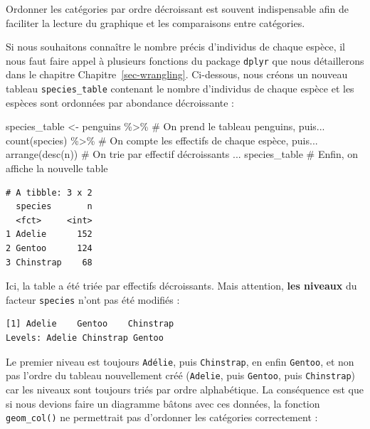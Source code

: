 \documentclass[
  letterpaper,
  DIV=11,
  numbers=noendperiod]{scrreprt}
\newenvironment{Shaded}{\begin{snugshade}}{\end{snugshade}}
\newcommand{\CommentTok}[1]{\textcolor[rgb]{0.37,0.37,0.37}{#1}}
\newcommand{\FunctionTok}[1]{\textcolor[rgb]{0.28,0.35,0.67}{#1}}
\newcommand{\NormalTok}[1]{\textcolor[rgb]{0.00,0.23,0.31}{#1}}
\newcommand{\OtherTok}[1]{\textcolor[rgb]{0.00,0.23,0.31}{#1}}
\newcommand{\SpecialCharTok}[1]{\textcolor[rgb]{0.37,0.37,0.37}{#1}}
\begin{document}
Ordonner les catégories par ordre décroissant est souvent indispensable
afin de faciliter la lecture du graphique et les comparaisons entre
catégories.

Si nous souhaitons connaître le nombre précis d'individus de chaque
espèce, il nous faut faire appel à plusieurs fonctions du package
\texttt{dplyr} que nous détaillerons dans le chapitre
Chapitre~\ref{sec-wrangling}. Ci-dessous, nous créons un nouveau tableau
\texttt{species\_table} contenant le nombre d'individus de chaque espèce
et les espèces sont ordonnées par abondance décroissante :

\begin{Shaded}
\begin{Highlighting}[]
\NormalTok{species\_table }\OtherTok{\textless{}{-}}\NormalTok{ penguins }\SpecialCharTok{\%\textgreater{}\%}   \CommentTok{\# On prend le tableau penguins, puis...}
  \FunctionTok{count}\NormalTok{(species) }\SpecialCharTok{\%\textgreater{}\%}            \CommentTok{\# On compte les effectifs de chaque espèce, puis...}
  \FunctionTok{arrange}\NormalTok{(}\FunctionTok{desc}\NormalTok{(n))              }\CommentTok{\# On trie par effectif décroissants ...}
\NormalTok{species\_table                   }\CommentTok{\# Enfin, on affiche la nouvelle table}
\end{Highlighting}
\end{Shaded}

\begin{verbatim}
# A tibble: 3 x 2
  species       n
  <fct>     <int>
1 Adelie      152
2 Gentoo      124
3 Chinstrap    68
\end{verbatim}

Ici, la table a été triée par effectifs décroissants. Mais attention,
\textbf{les niveaux} du facteur \texttt{species} n'ont pas été modifiés
:

\begin{Shaded}
\end{Shaded}

\begin{verbatim}
[1] Adelie    Gentoo    Chinstrap
Levels: Adelie Chinstrap Gentoo
\end{verbatim}

Le premier niveau est toujours \texttt{Adélie}, puis \texttt{Chinstrap},
en enfin \texttt{Gentoo}, et non pas l'ordre du tableau nouvellement
créé (\texttt{Adelie}, puis \texttt{Gentoo}, puis \texttt{Chinstrap})
car les niveaux sont toujours triés par ordre alphabétique. La
conséquence est que si nous devions faire un diagramme bâtons avec ces
données, la fonction \texttt{geom\_col()} ne permettrait pas d'ordonner
les catégories correctement :
\end{document}
